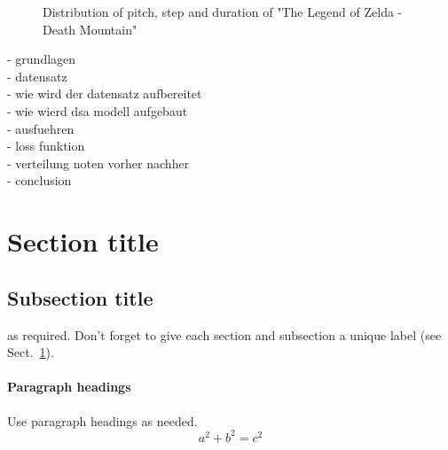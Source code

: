 \begin{figure}

\caption{Distribution of pitch, step and duration of "The Legend of Zelda - Death Mountain"}
\label{fig:verteilung}   
\end{figure}







- grundlagen\\
- datensatz\\
- wie wird der datensatz aufbereitet\\
- wie wierd dsa modell aufgebaut\\
- ausfuehren\\
- loss funktion\\
- verteilung noten vorher nachher\\
- conclusion\\

\section{Section title}
\label{sec:1}
\subsection{Subsection title}
\label{sec:2}
as required. Don't forget to give each section
and subsection a unique label (see Sect.~\ref{sec:1}).
\paragraph{Paragraph headings} Use paragraph headings as needed.
\begin{equation}
a^2+b^2=c^2
\end{equation}

